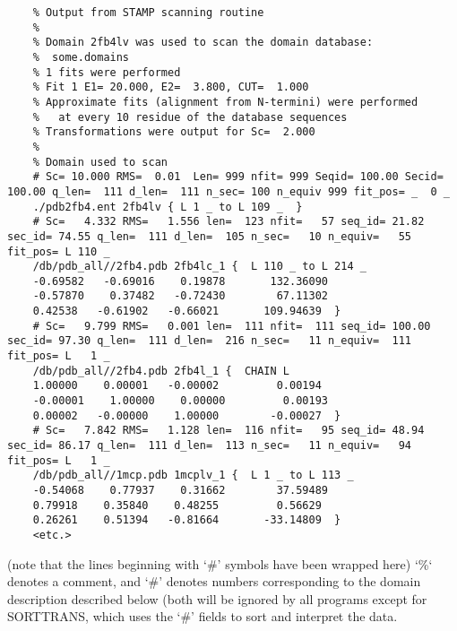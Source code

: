     \begin{scriptsize}\begin{verbatim}
    % Output from STAMP scanning routine
    %
    % Domain 2fb4lv was used to scan the domain database:
    %  some.domains
    % 1 fits were performed
    % Fit 1 E1= 20.000, E2=  3.800, CUT=  1.000
    % Approximate fits (alignment from N-termini) were performed
    %   at every 10 residue of the database sequences 
    % Transformations were output for Sc=  2.000
    % 
    % Domain used to scan 
    # Sc= 10.000 RMS=  0.01  Len= 999 nfit= 999 Seqid= 100.00 Secid= 100.00 q_len=  111 d_len=  111 n_sec= 100 n_equiv 999 fit_pos= _  0 _ 
    ./pdb2fb4.ent 2fb4lv { L 1 _ to L 109 _  }
    # Sc=   4.332 RMS=   1.556 len=  123 nfit=   57 seq_id= 21.82 sec_id= 74.55 q_len=  111 d_len=  105 n_sec=   10 n_equiv=   55 fit_pos= L 110 _ 
    /db/pdb_all//2fb4.pdb 2fb4lc_1 {  L 110 _ to L 214 _  
    -0.69582   -0.69016    0.19878       132.36090 
    -0.57870    0.37482   -0.72430        67.11302 
    0.42538   -0.61902   -0.66021       109.94639  }
    # Sc=   9.799 RMS=   0.001 len=  111 nfit=  111 seq_id= 100.00 sec_id= 97.30 q_len=  111 d_len=  216 n_sec=   11 n_equiv=  111 fit_pos= L   1 _ 
    /db/pdb_all//2fb4.pdb 2fb4l_1 {  CHAIN L  
    1.00000    0.00001   -0.00002         0.00194 
    -0.00001    1.00000    0.00000         0.00193 
    0.00002   -0.00000    1.00000        -0.00027  }
    # Sc=   7.842 RMS=   1.128 len=  116 nfit=   95 seq_id= 48.94 sec_id= 86.17 q_len=  111 d_len=  113 n_sec=   11 n_equiv=   94 fit_pos= L   1 _ 
    /db/pdb_all//1mcp.pdb 1mcplv_1 {  L 1 _ to L 113 _  
    -0.54068    0.77937    0.31662        37.59489 
    0.79918    0.35840    0.48255         0.56629 
    0.26261    0.51394   -0.81664       -33.14809  }
    <etc.>
    \end{verbatim} \end{scriptsize}

    (note that the lines beginning with `\#' symbols have been wrapped here)
    `\%` denotes a comment, and `\#' denotes numbers corresponding to the
    domain description described below (both will be ignored by all
    programs except for SORTTRANS, which uses the `\#' fields to sort
    and interpret the data. \\

